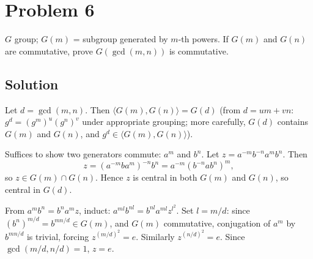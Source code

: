 \documentclass{article}
\begin{document}
\section*{Problem 6}
$G$ group; $G(m)$ = subgroup generated by $m$-th powers. If $G(m)$ and $G(n)$ are commutative, prove $G(\gcd(m, n))$ is commutative.

\subsection*{Solution}
Let $d = \gcd(m, n)$. Then $\langle G(m), G(n) \rangle = G(d)$ (from $d = um + vn$: $g^d = (g^m)^u (g^n)^v$ under appropriate grouping; more carefully, $G(d)$ contains $G(m)$ and $G(n)$, and $g^d \in \langle G(m), G(n)\rangle$).

Suffices to show two generators commute: $a^m$ and $b^n$. Let $z = a^{-m} b^{-n} a^m b^n$. Then
\[
z = (a^{-m} b a^m)^{-n} b^n = a^{-m} (b^{-n} a b^n)^m,
\]
so $z \in G(m) \cap G(n)$. Hence $z$ is central in both $G(m)$ and $G(n)$, so central in $G(d)$.

From $a^m b^n = b^n a^m z$, induct: $a^{ml} b^{nl} = b^{nl} a^{ml} z^{l^2}$. Set $l = m/d$: since $(b^n)^{m/d} = b^{mn/d} \in G(m)$, and $G(m)$ commutative, conjugation of $a^m$ by $b^{mn/d}$ is trivial, forcing $z^{(m/d)^2} = e$. Similarly $z^{(n/d)^2} = e$. Since $\gcd(m/d, n/d) = 1$, $z = e$.
\end{document}
